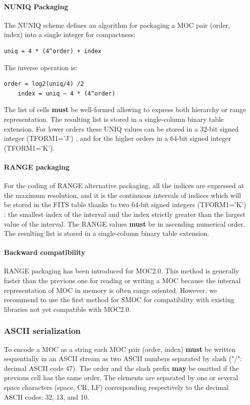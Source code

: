 \documentclass[11pt,a4paper]{ivoa}
\begin{document}
\paragraph{NUNIQ Packaging}
The NUNIQ scheme defines an algorithm for packaging a MOC pair (order,
index) into a single integer for compactness:
\begin{Verbatim}[frame=single]
    uniq = 4 * (4^order) + index
\end{Verbatim}

\par\noindent
The inverse operation is:
\begin{Verbatim}[frame=single]
    order = log2(uniq/4) /2
    index = uniq – 4 * (4^order)
\end{Verbatim}

\par\noindent The list of cells {\bf must} be well-formed allowing
to express both hierarchy or range representation. The resulting
list is stored in a single-column binary table extension. For
lower orders these UNIQ values can be stored in a 32-bit signed integer
(TFORM1='J') , and for the higher orders in a 64-bit signed integer
(TFORM1='K').

\paragraph{RANGE packaging}
For the coding of RANGE alternative packaging, all the indices are
expressed at the maximum resolution, and it is the continuous
intervals of indices which will be stored
in the FITS table thanks to two 64-bit signed integers (TFORM1='K') :
the smallest index of the interval and the index strictly greater
than the largest value of the interval. The RANGE values {\bf must}
be in ascending numerical order. The resulting list is stored in a
single-column binary table extension. 


\paragraph{Backward compatibility}
RANGE packaging has been introduced for MOC2.0.
This method is generally faster than the previous one for reading or
writing a MOC because the internal representation of MOC
in memory is often range oriented. However, we recommend to
use the first method for SMOC for compatibility with existing libraries 
not yet compatible with MOC2.0.

\subsubsection{ASCII serialization}
To encode a MOC as a string each MOC pair (order, index) {\bf must} be written
sequentially in an ASCII stream as two ASCII numbers separated
by slash ("/": decimal ASCII code 47). The order and the slash prefix
{\bf may} be omitted if the previous cell has the same order. The
elements are separated by one or several space characters (space, CR,
LF) corresponding respectively to the decimal ASCII codes: 32, 13, and
10.
\end{document}
